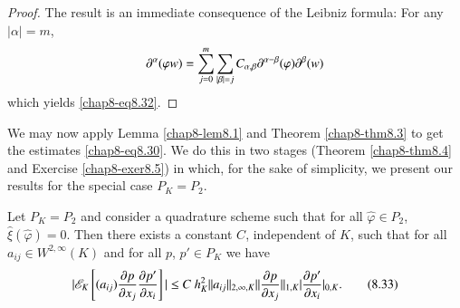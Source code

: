 \begin{proof}
The result is an immediate consequence of the Leibniz formula: For any
$|\alpha|=m$, 
$$ 
\partial^{\alpha}(\varphi
w)=\sum^{m}_{j=0}\sum_{|\beta|=j}C_{\alpha,\beta}\partial^{\alpha-\beta}(\varphi)\partial^{\beta}(w) 
$$
which yields \eqref{chap8-eq8.32}.
\end{proof}

We may now apply Lemma \ref{chap8-lem8.1} and Theorem
\ref{chap8-thm8.3} to get the estimates \eqref{chap8-eq8.30}. We do
this in two stages (Theorem \ref{chap8-thm8.4} and Exercise
\ref{chap8-exer8.5}) in which, for the sake of simplicity, we present
our results for the special case $P_{K}=P_{2}$.

\begin{theorem}\label{chap8-thm8.4}
Let $P_{K}=P_{2}$ and consider a quadrature scheme such that for all
$\hat{\varphi}\in P_{2}$, $\hat{\xi}(\hat{\varphi})=0$. Then there
exists a constant $C$, independent of $K$, such that for all
$a_{ij}\in W^{2,\infty}(K)$ and for all $p$, $p'\in P_{K}$ we have
\begin{equation*}
|\mathscr{E}_{K}\left[(a_{ij})\frac{\partial p}{\partial x_{j}}\frac{\partial p'}{\partial
    x_{i}}\right]|\leq C\ h^{2}_{K}||a_{ij}||_{2,\infty,K}||\frac{\partial
  p}{\partial x_{j}}||_{1,K}|\frac{\partial p'}{\partial
  x_{i}}|_{0,K}.\tag{8.33}\label{chap8-eq8.33} 
\end{equation*}
\end{theorem}

